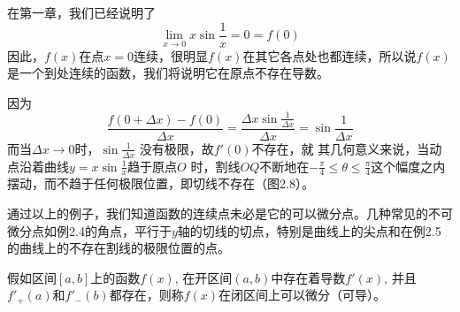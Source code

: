 \begin{solution}
在第一章，我们已经说明了
\[\lim_{x\to 0}x\sin\frac{1}{x}=0=f(0)\]
因此，$f(x)$在点$x=0$连续，很明显$f(x)$在其它各点处也都连续，所以说$f(x)$是一个到处连续的函数，我们将说明它在原点不存在导数。

因为
\[\frac{f(0+\Delta x)-f(0)}{\Delta x}=\frac{\Delta x\sin\frac{1}{\Delta x}}{\Delta x}=\sin\frac{1}{\Delta x}\]
而当$\Delta x\to 0$时，$\sin\frac{1}{\Delta x}$
没有极限，故$f'(0)$不存在，就
其几何意义来说，当动点沿着曲线$y=x\sin\frac{1}{x}$趋于原点$O$
时，割线$OQ$不断地在$-\frac{\pi}{4}\le \theta\le \frac{\pi}{4}$这个幅度之内摆动，而不趋于任何极限位置，即切线不存在（图2.8）。
\end{solution}

\begin{figure}[htp]
    \centering
{}
    \caption{}
\end{figure}

通过以上的例子，我们知道函数的连续点未必是它的可以微分点。几种常见的不可微分点如例2.4的角点，平行于$y$轴的切线的切点，特别是曲线上的尖点和在例2.5的曲线上的不存在割线的极限位置的点。

假如区间$[a,b]$上的函数$f(x)$, 在开区间$(a,b)$中存在着导数$f'(x)$, 并且$f'_+(a)$和$f'_-(b)$都存在，则称$f(x)$在闭区间上可以微分（可导）。

